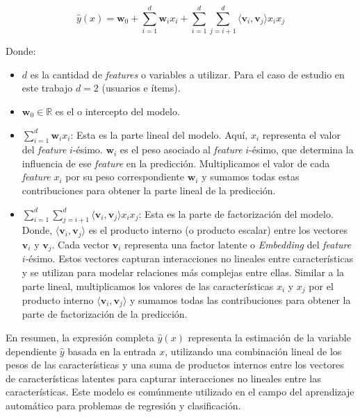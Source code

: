 \documentclass[11pt,a4paper,twoside]{thesis}
\begin{document}
\begin{equation}
	\hat{y}(x) = \mathbf{w}_0 + \sum_{i=1}^d \mathbf{w}_i x_i + \sum_{i=1}^d\sum_{j=i+1}^d
	\langle\mathbf{v}_i, \mathbf{v}_j\rangle x_i x_j
\end{equation}
\begin{description}
	\item[Donde:]
\end{description}
\begin{itemize}
	\item $d$ es la cantidad de \textit{features} o variables a utilizar.
	      Para el caso de estudio en este trabajo $d=2$ (usuarios e ítems).
	\item $\mathbf{w}_0 \in \mathbb{R}$ es el  o intercepto del modelo.
	\item $\sum_{i=1}^d \mathbf{w}_i x_i$: Esta es la parte lineal del modelo. Aquí,
	      $x_i$ representa el valor del \textit{feature} $i$-ésimo. $\mathbf{w}_i$ es
	      el peso asociado al \textit{feature} $i$-ésimo, que determina la influencia
	      de ese \textit{feature} en la predicción. Multiplicamos el valor de cada
	      \textit{feature} $x_i$ por su peso correspondiente $\mathbf{w}_i$ y sumamos
	      todas estas contribuciones para obtener la parte lineal de la predicción.
	\item $\sum_{i=1}^d\sum_{j=i+1}^d \langle\mathbf{v}_i, \mathbf{v}_j\rangle x_i x_j$:
	      Esta es la parte de factorización del modelo. Donde, $\langle\mathbf{v}_i,
		      \mathbf{v}_j\rangle$ es el producto interno (o producto escalar) entre
	      los vectores $\mathbf{v}_i$ y $\mathbf{v}_j$. Cada vector $\mathbf{v}_i$
	      representa una factor latente o \textit{Embedding} del \textit{feature}
	      $i$-ésimo. Estos vectores capturan interacciones no lineales entre
	      características y se utilizan para modelar relaciones más complejas
	      entre ellas. Similar a la parte lineal, multiplicamos los valores
	      de las características $x_i$ y $x_j$ por el producto interno
	      $\langle\mathbf{v}_i, \mathbf{v}_j\rangle$ y sumamos todas las contribuciones
	      para obtener la parte de factorización de la predicción.

\end{itemize}

En resumen, la expresión completa $\hat{y}(x)$ representa la estimación de la
variable dependiente $\hat{y}$ basada en la entrada $x$, utilizando una
combinación lineal de los pesos de las características y una suma de productos
internos entre los vectores de características latentes para capturar
interacciones no lineales entre las características. Este modelo es comúnmente
utilizado en el campo del aprendizaje automático para problemas de regresión y
clasificación.
\end{document}
